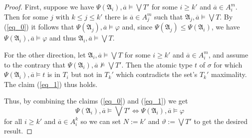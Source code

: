 \documentclass{ndjflart}
\theoremstyle{plain}
\theoremstyle{definition}
\numberwithin{equation}{section}
\begin{document}
\begin{proof}
First, suppose we have
$\Psi(\mathfrak{A}_i), \overline{a} \vDash \bigvee T'$ for some $i \geq k'$
and $\overline{a} \in A_i^m$.
Then for some $j$ with $k \leq j \leq k'$ there is $\overline{a} \in A_j^m$
such that $\mathfrak{A}_j, \overline{a} \vDash \bigvee T$.
By (\ref{eq_0}) it follows that
$\Psi(\mathfrak{A}_j), \overline{a} \vDash \varphi$
and, since $\Psi(\mathfrak{A}_j) \leq \Psi(\mathfrak{A}_i)$, we have
$\Psi(\mathfrak{A}_i), \overline{a} \vDash \varphi$ and thus
$\mathfrak{A}_i, \overline{a} \vDash \bigvee T$.

For the other direction, let $\mathfrak{A}_i, \overline{a} \vDash \bigvee T$
for some $i \geq k'$ and $\overline{a} \in A_i^m$, and
assume to the contrary that
$\Psi(\mathfrak{A}_i), \overline{a} \nvDash \bigvee T'$.
Then the atomic type $t$ of $\sigma$ for which
$\Psi(\mathfrak{A}_i), \overline{a} \vDash t$ is in $T_i$ but not in $T_k'$
which contradicts the set's $T_k'$ maximality.
The claim (\ref{eq_1}) thus holds.

Thus, by combining the claims (\ref{eq_0}) and (\ref{eq_1}) we get
\[
	\Psi(\mathfrak{A}_i), \overline{a} \vDash \bigvee T' \Leftrightarrow
	\Psi(\mathfrak{A}_i), \overline{a} \vDash \varphi
\]
for all $i \geq k'$ and $\overline{a} \in A_i^k$ so we can set
$N := k'$ and $\vartheta := \bigvee T'$ to get the desired result.
\end{proof}
\end{document}
